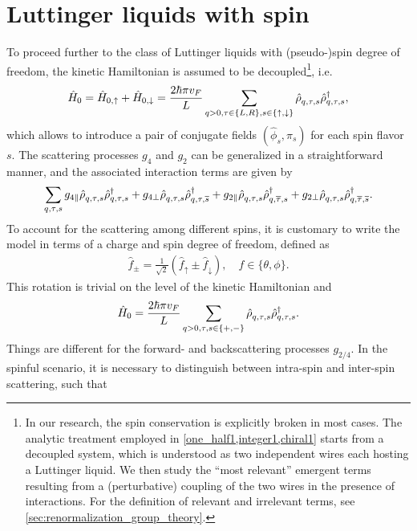 \documentclass{svmono}
\def\pdag{{\vphantom\dag}}
\newcommand{\brlr}[1]{\left( #1 \right)}
\begin{document}
\section{Luttinger liquids with spin}
\label{sec:LL_with_spin}
To proceed further to the class of Luttinger liquids with (pseudo-)spin degree of freedom, the kinetic Hamiltonian is assumed to be decoupled\footnote{In our research, the spin conservation is explicitly broken in most cases. The analytic treatment employed in \cref{one_half1,integer1,chiral1} starts from a decoupled system, which is understood as two independent wires each hosting a Luttinger liquid. We then study the ``most relevant'' emergent terms resulting from a (perturbative) coupling of the two wires in the presence of interactions. For the definition of relevant and irrelevant terms, see \cref{sec:renormalization_group_theory}.}, i.e.
\begin{align}
    \hat H_0 = \hat H_{0,\uparrow}+\hat H_{0,\downarrow}
    = \frac{2\hbar\pi v_F}L\sum_{q>0,\tau\in\{L,R\},s\in\{\uparrow,\downarrow\}}\hat\rho^\pdag_{q,\tau,s}\hat\rho^\dag_{q,\tau,s},
\end{align}
which allows to introduce a pair of conjugate fields $(\hat \phi_s,\hat \pi_s)$ for each spin flavor $s$.
The scattering processes $g_4$ and $g_2$ can be generalized in a straightforward manner, and the associated interaction terms are given by
\begin{align}
  \sum_{q,\tau,s}
  g_{4\parallel}\hat\rho^\pdag_{q,\tau,s}\hat\rho^\dag_{q,\tau,s}
  +
  g_{4\perp}\hat\rho^\pdag_{q,\tau,s}\hat\rho^\dag_{q,\tau,\overline s}
  +
  g_{2\parallel}\hat\rho^\pdag_{q,\tau,s}\hat\rho^\dag_{q,\overline\tau,s}
  +
  g_{2\perp}\hat\rho^\pdag_{q,\tau,s}\hat\rho^\dag_{q,\overline\tau,\overline s}.
\end{align}
To account for the scattering among different spins, it is customary to write the model in terms of a charge and spin degree of freedom, defined as
\begin{align}
    \hat f_\pm=\frac1{\sqrt2}\brlr{\hat f_\uparrow \pm \hat f_\downarrow},
    \quad
f\in\{\theta,\phi\}.
\end{align}
This rotation is trivial on the level of the kinetic Hamiltonian and
\begin{align}
    \hat H_0 = \frac{2\hbar\pi v_F}L\sum_{q>0,\tau,s\in\{+,-\}}\hat\rho^\pdag_{q,\tau,s}\hat\rho^\dag_{q,\tau,s}.
\end{align}
Things are different for the forward- and backscattering processes $g_{2/4}$.
In the spinful scenario, it is necessary to distinguish between intra-spin and inter-spin scattering, such that
\end{document}
